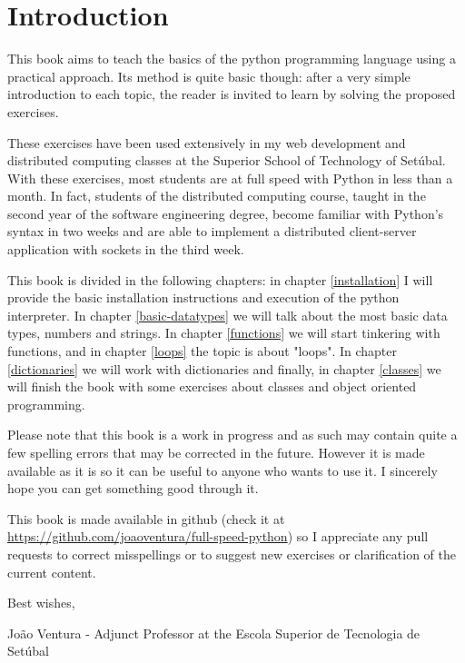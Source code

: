 \chapter{Introduction}\label{introduction}

This book aims to teach the basics of the python programming language using a practical approach. Its method is quite basic though: after a very simple introduction to each topic, the reader is invited to learn by solving the proposed exercises.

These exercises have been used extensively in my web development and distributed computing classes at the Superior School of Technology of Setúbal. With these exercises, most students are at full speed with Python in less than a month. In fact, students of the distributed computing course, taught in the second year of the software engineering degree, become familiar with Python's syntax in two weeks and are able to implement a distributed client-server application with sockets in the third week.

This book is divided in the following chapters: in chapter \ref{installation} I will provide the basic installation instructions and execution of the python interpreter. In chapter \ref{basic-datatypes} we will talk about the most basic data types, numbers and strings. In chapter \ref{functions} we will start tinkering with functions, and in chapter \ref{loops} the topic is about "loops". In chapter \ref{dictionaries} we will work with dictionaries and finally, in chapter \ref{classes} we will finish the book with some exercises about classes and object oriented programming.

Please note that this book is a work in progress and as such may contain quite a few spelling errors that may be corrected in the future. However it is made available as it is so it can be useful to anyone who wants to use it. I sincerely hope you can get something good through it.

This book is made available in github (check it at \url{https://github.com/joaoventura/full-speed-python}) so I appreciate any pull requests to correct misspellings or to suggest new exercises or clarification of the current content.

Best wishes,

João Ventura - Adjunct Professor at the Escola Superior de Tecnologia de Setúbal